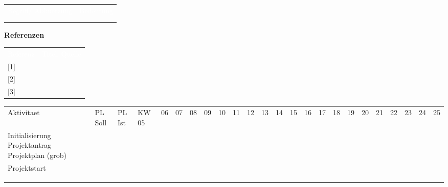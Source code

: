 \documentclass[10pt,paper=a4,final]{scrartcl}
\begin{document}
\begin{tabularx}{\textwidth}{l X}
\textcolor{white}{Begriff/ Abkuerzung}\cellcolor{blue!80!} & \textcolor{white}{Bedeutung}\cellcolor{blue!80!} \\
\cellcolor{blue!20!} & \cellcolor{blue!20!} \\
\cellcolor{blue!20!} & \cellcolor{blue!20!} \\
\end{tabularx}
\newline
\newline
\newline
{\bf Referenzen}
\newline

\begin{tabularx}{\textwidth}{l X}
\textcolor{white}{Referenz}\cellcolor{blue!80!} & \textcolor{white}{Titel, Quelle}\cellcolor{blue!80!} \\
\cellcolor{blue!20!}[1] & \cellcolor{blue!20!} \\
\cellcolor{blue!20!}[2] & \cellcolor{blue!20!} \\
\cellcolor{blue!20!}[3] & \cellcolor{blue!20!} \\
\end{tabularx}
\newpage
\begin{landscape}
\begin{tabularx}{\textwidth}{ |p{4.5cm}|l|l|l|l|l|l|l|l|l|l|l|l|l|l|l|l|l|l|l|l|l|l|l| }
\cline{1-24}	%
Aktivitaet & PL Soll & PL Ist & KW 05 & 06 & 07 & 08 & 09 & 10 & 11 & 12 & 13 & 14 & 15 & 16 & 17 & 18 & 19 & 20 & 21 & 22 & 23 & 24 & 25 \\
\cline{1-24}
Initialisierung Projektantrag Projektplan (grob) & & & & \cellcolor[gray]{0.7}& & & & & & & & & & & & & & & & & & & \\
\cline{1-24}
Projektstart & & & &\cellcolor[gray]{0.7} & & & & & & & & & & & & & & & & & & & \\
\cline{1-24}
& & & & & & & & & & & & & & & & & & & & & & & \\
\cline{1-24}
& & & & & & & & & & & & & & & & & & & & & & & \\
\cline{1-24}
& & & & & & & & & & & & & & & & & & & & & & & \\
\cline{1-24}
\end{tabularx}
\end{landscape}
\end{document}
